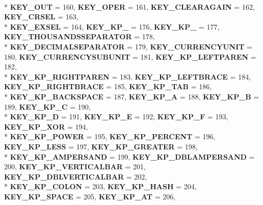 \begin{DoxyCompactItemize}
\\*
{\bfseries K\+E\+Y\+\_\+\+O\+U\+T} = 160, 
{\bfseries K\+E\+Y\+\_\+\+O\+P\+E\+R} = 161, 
{\bfseries K\+E\+Y\+\_\+\+C\+L\+E\+A\+R\+A\+G\+A\+I\+N} = 162, 
{\bfseries K\+E\+Y\+\_\+\+C\+R\+S\+E\+L} = 163, 
\\*
{\bfseries K\+E\+Y\+\_\+\+E\+X\+S\+E\+L} = 164, 
{\bfseries K\+E\+Y\+\_\+\+K\+P\+\_} = 176, 
{\bfseries K\+E\+Y\+\_\+\+K\+P\+\_} = 177, 
{\bfseries K\+E\+Y\+\_\+\+T\+H\+O\+U\+S\+A\+N\+D\+S\+S\+E\+P\+A\+R\+A\+T\+O\+R} = 178, 
\\*
{\bfseries K\+E\+Y\+\_\+\+D\+E\+C\+I\+M\+A\+L\+S\+E\+P\+A\+R\+A\+T\+O\+R} = 179, 
{\bfseries K\+E\+Y\+\_\+\+C\+U\+R\+R\+E\+N\+C\+Y\+U\+N\+I\+T} = 180, 
{\bfseries K\+E\+Y\+\_\+\+C\+U\+R\+R\+E\+N\+C\+Y\+S\+U\+B\+U\+N\+I\+T} = 181, 
{\bfseries K\+E\+Y\+\_\+\+K\+P\+\_\+\+L\+E\+F\+T\+P\+A\+R\+E\+N} = 182, 
\\*
{\bfseries K\+E\+Y\+\_\+\+K\+P\+\_\+\+R\+I\+G\+H\+T\+P\+A\+R\+E\+N} = 183, 
{\bfseries K\+E\+Y\+\_\+\+K\+P\+\_\+\+L\+E\+F\+T\+B\+R\+A\+C\+E} = 184, 
{\bfseries K\+E\+Y\+\_\+\+K\+P\+\_\+\+R\+I\+G\+H\+T\+B\+R\+A\+C\+E} = 185, 
{\bfseries K\+E\+Y\+\_\+\+K\+P\+\_\+\+T\+A\+B} = 186, 
\\*
{\bfseries K\+E\+Y\+\_\+\+K\+P\+\_\+\+B\+A\+C\+K\+S\+P\+A\+C\+E} = 187, 
{\bfseries K\+E\+Y\+\_\+\+K\+P\+\_\+\+A} = 188, 
{\bfseries K\+E\+Y\+\_\+\+K\+P\+\_\+\+B} = 189, 
{\bfseries K\+E\+Y\+\_\+\+K\+P\+\_\+\+C} = 190, 
\\*
{\bfseries K\+E\+Y\+\_\+\+K\+P\+\_\+\+D} = 191, 
{\bfseries K\+E\+Y\+\_\+\+K\+P\+\_\+\+E} = 192, 
{\bfseries K\+E\+Y\+\_\+\+K\+P\+\_\+\+F} = 193, 
{\bfseries K\+E\+Y\+\_\+\+K\+P\+\_\+\+X\+O\+R} = 194, 
\\*
{\bfseries K\+E\+Y\+\_\+\+K\+P\+\_\+\+P\+O\+W\+E\+R} = 195, 
{\bfseries K\+E\+Y\+\_\+\+K\+P\+\_\+\+P\+E\+R\+C\+E\+N\+T} = 196, 
{\bfseries K\+E\+Y\+\_\+\+K\+P\+\_\+\+L\+E\+S\+S} = 197, 
{\bfseries K\+E\+Y\+\_\+\+K\+P\+\_\+\+G\+R\+E\+A\+T\+E\+R} = 198, 
\\*
{\bfseries K\+E\+Y\+\_\+\+K\+P\+\_\+\+A\+M\+P\+E\+R\+S\+A\+N\+D} = 199, 
{\bfseries K\+E\+Y\+\_\+\+K\+P\+\_\+\+D\+B\+L\+A\+M\+P\+E\+R\+S\+A\+N\+D} = 200, 
{\bfseries K\+E\+Y\+\_\+\+K\+P\+\_\+\+V\+E\+R\+T\+I\+C\+A\+L\+B\+A\+R} = 201, 
{\bfseries K\+E\+Y\+\_\+\+K\+P\+\_\+\+D\+B\+L\+V\+E\+R\+T\+I\+C\+A\+L\+B\+A\+R} = 202, 
\\*
{\bfseries K\+E\+Y\+\_\+\+K\+P\+\_\+\+C\+O\+L\+O\+N} = 203, 
{\bfseries K\+E\+Y\+\_\+\+K\+P\+\_\+\+H\+A\+S\+H} = 204, 
{\bfseries K\+E\+Y\+\_\+\+K\+P\+\_\+\+S\+P\+A\+C\+E} = 205, 
{\bfseries K\+E\+Y\+\_\+\+K\+P\+\_\+\+A\+T} = 206, 

\end{DoxyCompactItemize}
